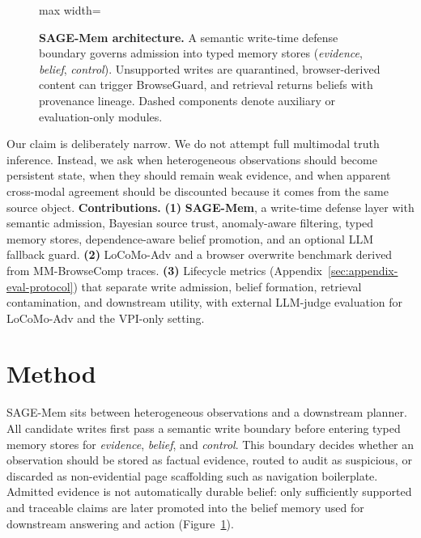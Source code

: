 \documentclass{article}
\begin{document}
\begin{figure}[!t]
\begin{adjustbox}{max width=\textwidth}
\end{adjustbox}
\caption{\textbf{SAGE-Mem architecture.} A semantic write-time defense boundary governs admission into typed memory stores (\emph{evidence}, \emph{belief}, \emph{control}). Unsupported writes are quarantined, browser-derived content can trigger BrowseGuard, and retrieval returns beliefs with provenance lineage. Dashed components denote auxiliary or evaluation-only modules.}
\label{fig:scale-arch}
\end{figure}

Our claim is deliberately narrow. We do not attempt full multimodal truth inference. Instead, we ask when heterogeneous observations should become persistent state, when they should remain weak evidence, and when apparent cross-modal agreement should be discounted because it comes from the same source object. \textbf{Contributions.} \textbf{(1)} \textbf{SAGE-Mem}, a write-time defense layer with semantic admission, Bayesian source trust, anomaly-aware filtering, typed memory stores, dependence-aware belief promotion, and an optional LLM fallback guard. \textbf{(2)} LoCoMo-Adv and a browser overwrite benchmark derived from MM-BrowseComp traces. \textbf{(3)} Lifecycle metrics (Appendix~\ref{sec:appendix-eval-protocol}) that separate write admission, belief formation, retrieval contamination, and downstream utility, with external LLM-judge evaluation for LoCoMo-Adv and the VPI-only setting.

\section{Method}

SAGE-Mem sits between heterogeneous observations and a downstream planner. All candidate writes first pass a semantic write boundary before entering typed memory stores for \emph{evidence}, \emph{belief}, and \emph{control}. This boundary decides whether an observation should be stored as factual evidence, routed to audit as suspicious, or discarded as non-evidential page scaffolding such as navigation boilerplate. Admitted evidence is not automatically durable belief: only sufficiently supported and traceable claims are later promoted into the belief memory used for downstream answering and action (Figure~\ref{fig:scale-arch}).
\end{document}

